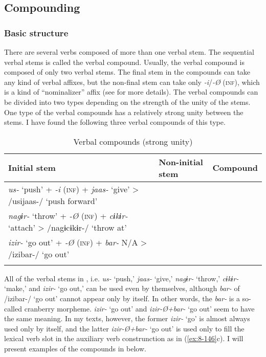 \subsection{Compounding}
\subsubsection{Basic structure}

There are several verbs composed of more than one verbal stem. The sequential verbal stems is called the verbal compound. Usually, the verbal compound is composed of only two verbal stems. The final stem in the compounds can take any kind of verbal affixes, but the non-final stem can take only \textit{-i}/\textit{-Ø} (\textsc{inf}), which is a kind of “nominalizer” affix (see  for more details). The verbal compounds can be divided into two types depending on the strength of the unity of the stems. One type of the verbal compounds has a relatively strong unity between the stems. I have found the following three verbal compounds of this type.

\begin{table}
\caption{\label{tab:key:85}Verbal compounds (strong unity)}
\begin{tabular}{lll}
  \lsptoprule
Initial stem   & Non-initial stem    & Compound\\
\midrule
\textit{us-}  ‘push’  +  \textit{-i} (\textsc{inf})  +  \textit{jaas-}  ‘give’  >  /usijaas-/  ‘push forward’\\
\textit{nagɨr-}  ‘throw’  +  \textit{-Ø} (\textsc{inf})  +  \textit{cɨkɨr-}  ‘attach’  >  /nagɨcɨkɨr-/  ‘throw at’\\
\textit{izir-}  ‘go out’  +  \textit{-Ø} (\textsc{inf})  +  \textit{bar-}  N/A  >  /izibar-/  ‘go out’\\
\lspbottomrule
\end{tabular}
\end{table}

All of the verbal stems in , i.e. \textit{us-} ‘push,’ \textit{jaas-} ‘give,’ \textit{nagɨr-} ‘throw,’ \textit{cɨkɨr-} ‘make,’ and \textit{izir-} ‘go out,’ can be used even by themselves, although \textit{bar-} of /izibar-/ ‘go out’ cannot appear only by itself. In other words, the \textit{bar-} is a so-called cranberry morpheme. \textit{izir-} ‘go out’ and \textit{izir-Ø+bar-} ‘go out’ seem to have the same meaning. In my texts, however, the former \textit{izir-} ‘go’ is almost always used only by itself, and the latter \textit{izir-Ø+bar-} ‘go out’ is used only to fill the lexical verb slot in the auxiliary verb construnction as in (\ref{ex:8-146}c). I will present examples of the compounds in  below.

